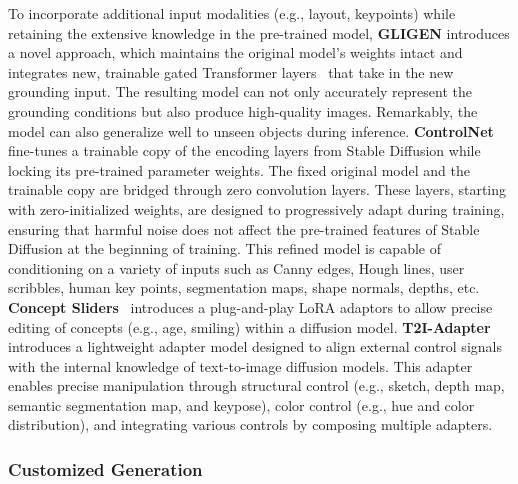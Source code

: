 To incorporate additional input modalities (e.g., layout, keypoints) while retaining the extensive knowledge in the pre-trained model, \textbf{GLIGEN} introduces a novel approach, which maintains the original model's weights intact and integrates new, trainable gated Transformer layers~\cite{alayrac2022flamingo} that take in the new grounding input. The resulting model can not only accurately represent the grounding conditions but also produce high-quality images. Remarkably, the model can also generalize well to unseen objects during inference.
\textbf{ControlNet} \cite{zhang2023adding} fine-tunes a trainable copy of the encoding layers from Stable Diffusion while locking its pre-trained parameter weights. The fixed original model and the trainable copy are bridged through zero convolution layers. These layers, starting with zero-initialized weights, are designed to progressively adapt during training, ensuring that harmful noise does not affect the pre-trained features of Stable Diffusion at the beginning of training. This refined model is capable of conditioning on a variety of inputs such as Canny edges, Hough lines, user scribbles, human key points, segmentation maps, shape normals, depths, etc.
\textbf{Concept Sliders}~\cite{gandikota2023concept} introduces a plug-and-play LoRA adaptors to allow precise editing of concepts (e.g., age, smiling) within a diffusion model.
\textbf{T2I-Adapter} \cite{mou2023t2i} introduces a lightweight adapter model designed to align external control signals with the internal knowledge of text-to-image diffusion models. This adapter enables precise manipulation through structural control (e.g., sketch, depth map, semantic segmentation map, and keypose), color control (e.g., hue and color distribution), and integrating various controls by composing multiple adapters. 




\subsubsection{Customized Generation}

